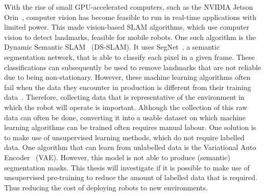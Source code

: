 With the rise of small GPU-accelerated computers, such as the NVIDIA Jetson Orin~\cite{NVIDIA_Karumbunathan_2022}, computer vision has become feasible to run in real-time applications with limited power. This made vision-based SLAM algorithms, which use computer vision to detect landmarks, feasible for mobile robots. One such algorithm is the Dynamic Semantic SLAM~\cite{yu2018ds} (DS-SLAM). It uses SegNet~\cite{badri2017segnet}, a semantic segmentation network, that is able to classify each pixel in a given frame. These classifications can subsequently be used to remove landmarks that are not reliable due to being non-stationary. However, these machine learning algorithms often fail when the data they encounter in production is different from their training data~\cite{Goodfellow-et-al-2016,ozdag2018adversarial,warde201611,10.14778/3632093.3632098,DBLP:journals/corr/KurakinGB16a,10.1145/3422622}. Therefore, collecting data that is representative of the environment in which the robot will operate is important. Although the collection of this raw data can often be done, converting it into a usable dataset on which machine learning algorithms can be trained often requires manual labour. One solution is to make use of unsupervised learning methods, which do not require labelled data. One algorithm that can learn from unlabelled data is the Variational Auto Encoder~\cite{kingma2014autoencodingvariationalbayes} (VAE). However, this model is not able to produce (semantic) segmentation masks. This thesis will investigate if it is possible to make use of unsupervised pre-training to reduce the amount of labelled data that is required. Thus reducing the cost of deploying robots to new environments.

